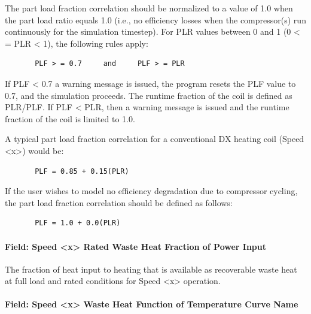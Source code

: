 The part load fraction correlation should be normalized to a value of 1.0 when the part load ratio equals 1.0 (i.e., no efficiency losses when the compressor(s) run continuously for the simulation timestep). For PLR values between 0 and 1 (0 \textless{} = PLR \textless{} 1), the following rules apply:

\begin{lstlisting}
       PLF > = 0.7     and     PLF > = PLR
\end{lstlisting}

If PLF \textless{} 0.7 a warning message is issued, the program resets the PLF value to 0.7, and the simulation proceeds. The runtime fraction of the coil is defined as PLR/PLF. If PLF \textless{} PLR, then a warning message is issued and the runtime fraction of the coil is limited to 1.0.

A typical part load fraction correlation for a conventional DX heating coil (Speed \textless{}x\textgreater{}) would be:

\begin{lstlisting}
       PLF = 0.85 + 0.15(PLR)
\end{lstlisting}

If the user wishes to model no efficiency degradation due to compressor cycling, the part load fraction correlation should be defined as follows:

\begin{lstlisting}
       PLF = 1.0 + 0.0(PLR)
\end{lstlisting}

\paragraph{Field: Speed \textless{}x\textgreater{} Rated Waste Heat Fraction of Power Input}\label{field-speed-x-rated-waste-heat-fraction-of-power-input-1}

The fraction of heat input to heating that is available as recoverable waste heat at full load and rated conditions for Speed \textless{}x\textgreater{} operation.

\paragraph{Field: Speed \textless{}x\textgreater{} Waste Heat Function of Temperature Curve Name}\label{field-speed-x-waste-heat-function-of-temperature-curve-name-1}

